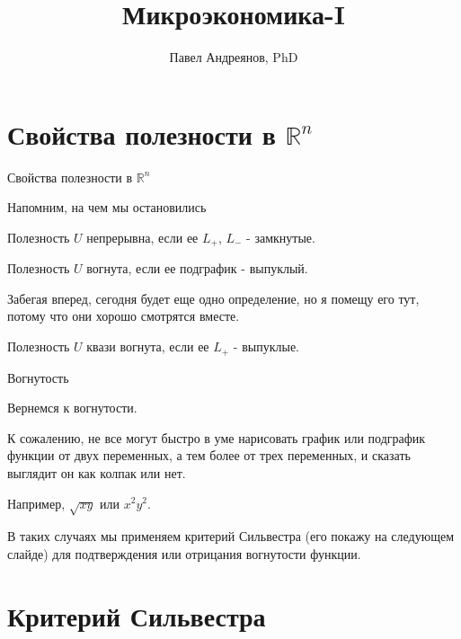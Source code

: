 \documentclass{beamer}
\title{
Микроэкономика-I
}
\author{
Павел Андреянов, PhD
}
\begin{document}
\maketitle

\section{Свойства полезности в $\mathbb{R}^n$}

\begin{frame}{Свойства полезности в $\mathbb{R}^n$}

Напомним, на чем мы остановились

\begin{definition}
Полезность $U$ \alert{непрерывна}, если ее $L_+$, $L_-$ - замкнутые.
\end{definition}

\begin{definition}
Полезность $U$ \alert{вогнута}, если ее подграфик - выпуклый.
\end{definition}

Забегая вперед, сегодня будет еще одно определение, но я помещу его тут, потому что они хорошо смотрятся вместе.

\begin{definition}
Полезность $U$ \alert{квази вогнута}, если ее $L_+$ - выпуклые.
\end{definition}

\end{frame}

\begin{frame}{Вогнутость}

Вернемся к \alert{вогнутости}.

К сожалению, не все могут быстро в уме нарисовать график или подграфик функции от двух переменных, а тем более от трех переменных, и сказать выглядит он как колпак или нет.

Например, $\sqrt{xy}$ или $x^2y^2$.

В таких случаях мы применяем \alert{критерий Сильвестра} (его покажу на следующем слайде) для подтверждения или отрицания вогнутости функции.

\end{frame}

\section{Критерий Сильвестра}
\end{document}
